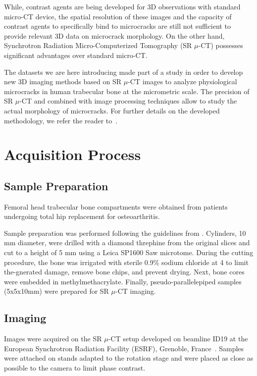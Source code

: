 \documentclass{InsightArticle}
\begin{document}
While, contrast agents are being developed for 3D observations with standard
micro-CT device, the spatial resolution of these images and the capacity of
contrast agents to specifically bind to microcracks are still not sufficient
to provide relevant 3D data on microcrack morphology. On the other hand,
Synchrotron Radiation Micro-Computerized Tomography (SR $\mu$-CT) possesses
significant advantages over standard micro-CT.

The datasets we are here introducing made part of a study in order to develop 
 new 3D imaging methods based on SR $\mu$-CT images to analyze physiological
microcracks in human trabecular bone at the micrometric scale. The precision
of SR $\mu$-CT and combined with image processing techniques allow to study
 the actual morphology of microcracks. For further details on the developed
methodology, we refer the reader to~\cite{Larrue2011}. 

\section{Acquisition Process}
\subsection{Sample Preparation}
Femoral head trabecular bone compartments were obtained from patients undergoing  
total hip replacement for osteoarthritis. 

Sample preparation was performed following the guidelines from \cite{Davies2006}. 
Cylinders, 10 mm diameter, were drilled with a diamond threphine from the original 
slices and cut to a height of 5 mm using a Leica SP1600 Saw microtome. During the 
cutting procedure, the bone was irrigated with sterile 0.9\% sodium chloride at 
4\textcelsius  %
 to limit the-gnerated damage, remove bone chips, and prevent drying.
Next, bone cores were embedded in methylmethacrylate. Finally, pseudo-parallelepiped 
samples (5x5x10mm) were prepared for SR $\mu$-CT imaging.  

\subsection{Imaging}
Images were acquired on the SR $\mu$-CT setup developed on beamline ID19 at 
the European Synchrotron Radiation Facility (ESRF), Grenoble, France~\cite{Weitkamp2010}. 
Samples were attached on stands adapted to the rotation stage and were placed as 
close as possible to the camera to limit phase contrast.  
\end{document}
